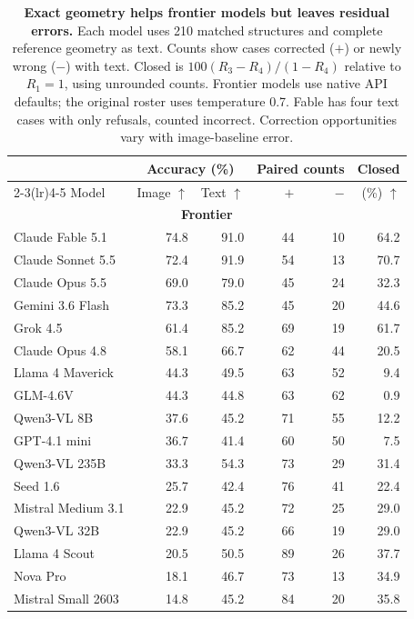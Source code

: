 \begin{table}[tbp]
\centering
\caption{\textbf{Exact geometry helps frontier models but leaves residual errors.} Each model uses 210 matched structures and complete reference geometry as text. Counts show cases corrected ($+$) or newly wrong ($-$) with text. Closed is $100(R_3-R_4)/(1-R_4)$ relative to $R_1=1$, using unrounded counts. Frontier models use native API defaults; the original roster uses temperature 0.7. Fable has four text cases with only refusals, counted incorrect. Correction opportunities vary with image-baseline error.}
\label{tab:vlm_substitution}
\footnotesize
\setlength{\tabcolsep}{2pt}
\renewcommand{\arraystretch}{1.08}
\begin{tabular*}{\columnwidth}{@{\extracolsep{\fill}}lrrrrr@{}}
\toprule
&\multicolumn{2}{c}{Accuracy (\%)}&\multicolumn{2}{c}{Paired counts}&Closed\\
\cmidrule(lr){2-3}\cmidrule(lr){4-5}
Model & Image $\uparrow$ & Text $\uparrow$ & $+$ & $-$ & (\%) $\uparrow$\\
\midrule
\multicolumn{6}{c}{\textbf{Frontier}}\\
\midrule
Claude Fable 5.1 & 74.8 & 91.0 & 44 & 10 & 64.2\\
Claude Sonnet 5.5 & 72.4 & 91.9 & 54 & 13 & 70.7\\
Claude Opus 5.5 & 69.0 & 79.0 & 45 & 24 & 32.3\\
\midrule
Gemini 3.6 Flash & 73.3 & 85.2 & 45 & 20 & 44.6\\
Grok 4.5 & 61.4 & 85.2 & 69 & 19 & 61.7\\
Claude Opus 4.8 & 58.1 & 66.7 & 62 & 44 & 20.5\\
Llama 4 Maverick & 44.3 & 49.5 & 63 & 52 & 9.4\\
GLM-4.6V & 44.3 & 44.8 & 63 & 62 & 0.9\\
Qwen3-VL 8B & 37.6 & 45.2 & 71 & 55 & 12.2\\
GPT-4.1 mini & 36.7 & 41.4 & 60 & 50 & 7.5\\
Qwen3-VL 235B & 33.3 & 54.3 & 73 & 29 & 31.4\\
Seed 1.6 & 25.7 & 42.4 & 76 & 41 & 22.4\\
Mistral Medium 3.1 & 22.9 & 45.2 & 72 & 25 & 29.0\\
Qwen3-VL 32B & 22.9 & 45.2 & 66 & 19 & 29.0\\
Llama 4 Scout & 20.5 & 50.5 & 89 & 26 & 37.7\\
Nova Pro & 18.1 & 46.7 & 73 & 13 & 34.9\\
Mistral Small 2603 & 14.8 & 45.2 & 84 & 20 & 35.8\\
\bottomrule
\end{tabular*}
\end{table}
